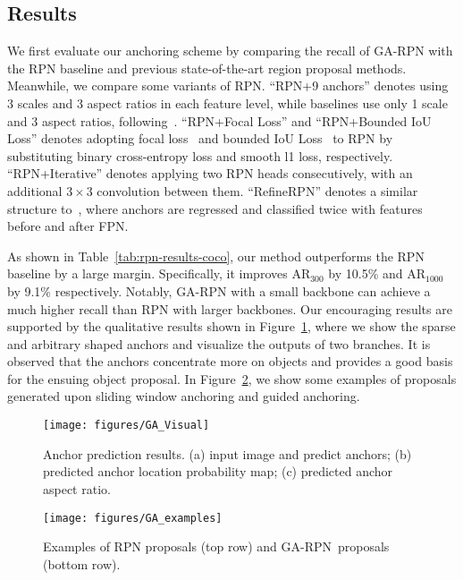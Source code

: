 \documentclass[10pt,twocolumn,letterpaper]{article}
\newcommand{\algname}{GA-RPN}
\begin{document}
\subsection{Results}

We first evaluate our anchoring scheme by comparing the recall of GA-RPN
with the RPN baseline and previous state-of-the-art region proposal methods.
Meanwhile, we compare some variants of RPN.
``RPN+9 anchors'' denotes using 3 scales and 3 aspect ratios in each feature level,
while baselines use only 1 scale and 3 aspect ratios, following~\cite{lin2017feature}.
``RPN+Focal Loss'' and ``RPN+Bounded IoU Loss'' denotes adopting focal loss~\cite{lin2017focal} 
and bounded IoU Loss~\cite{tychsen2018improving} to RPN by substituting binary cross-entropy loss and smooth l1 loss, respectively.
``RPN+Iterative'' denotes applying two RPN heads consecutively,
with an additional $3\times3$ convolution between them.
``RefineRPN'' denotes a similar structure to~\cite{zhang2017single},
where anchors are regressed and classified twice with features before and after FPN.

As shown in Table~\ref{tab:rpn-results-coco}, our method outperforms the RPN baseline by a large margin.
Specifically, it improves $\text{AR}_{300}$ by 10.5\% and $\text{AR}_{1000}$ by
9.1\% respectively.
Notably, GA-RPN with a small backbone can achieve a much higher recall than
RPN with larger backbones.
Our encouraging results are supported by the qualitative results shown in
Figure~\ref{fig:visualization}, where we show the sparse and arbitrary shaped
anchors and visualize the outputs of two branches.
It is observed that the anchors concentrate more on objects and provides
a good basis for the ensuing object proposal.
In Figure~\ref{fig:examples}, we show some examples of proposals generated upon
sliding window anchoring and guided anchoring.

\begin{figure}[t]
	\centering
	\texttt{[image: figures/GA\_Visual]}
	\vskip -0.25cm
	\caption{\small{Anchor prediction results. (a) input image and predict anchors;
		(b) predicted anchor location probability map; (c) predicted anchor aspect ratio.}}
	\label{fig:visualization}
	\vspace{-5pt}
\end{figure}

\begin{figure}[t]
	\centering
	\texttt{[image: figures/GA\_examples]}
	\caption{\small{Examples of RPN proposals (top row) and \algname~proposals (bottom row).}}
	\label{fig:examples}
	\vspace{-10pt}
\end{figure}
\end{document}
